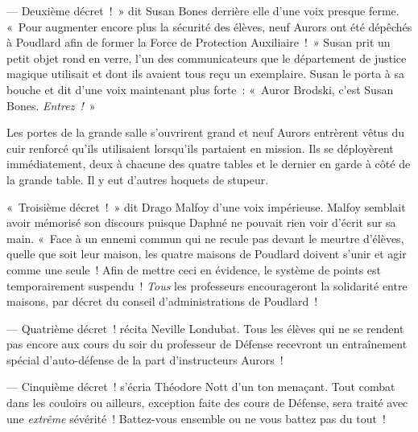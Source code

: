 --- Deuxième décret~!~»
dit Susan Bones derrière elle d'une voix presque ferme.
«~Pour augmenter encore plus la sécurité des élèves, neuf Aurors ont été dépêchés à Poudlard afin de former la Force de Protection Auxiliaire~!~»
Susan prit un petit objet rond en verre, l'un des communicateurs que le département de justice magique utilisait et dont ils avaient tous reçu un exemplaire.
Susan le porta à sa bouche et dit d'une voix maintenant plus forte~: «~Auror Brodski, c'est Susan Bones.
\emph{Entrez~!}~»

Les portes de la grande salle s'ouvrirent grand et neuf Aurors entrèrent vêtus du cuir renforcé qu'ils utilisaient lorsqu'ils partaient en mission.
Ils se déployèrent immédiatement, deux à chacune des quatre tables et le dernier en garde à côté de la grande table.
Il y eut d'autres hoquets de stupeur.

«~Troisième décret~!~»
dit Drago Malfoy d'une voix impérieuse.
Malfoy semblait avoir mémorisé son discours puisque Daphné ne pouvait rien voir d'écrit sur sa main.
«~Face à un ennemi commun qui ne recule pas devant le meurtre d'élèves, quelle que soit leur maison, les quatre maisons de Poudlard doivent s'unir et agir comme une seule~!
Afin de mettre ceci en évidence, le système de points est temporairement suspendu~!
\emph{Tous} les professeurs encourageront la solidarité entre maisons, par décret du conseil d'administrations de Poudlard~!

--- Quatrième décret~! récita Neville Londubat.
Tous les élèves qui ne se rendent pas encore aux cours du soir du professeur de Défense recevront un entraînement spécial d'auto-défense de la part d'instructeurs Aurors~!

--- Cinquième décret~! s'écria Théodore Nott d'un ton menaçant.
Tout combat dans les couloirs ou ailleurs, exception faite des cours de Défense, sera traité avec une \emph{extrême} sévérité~!
Battez-vous ensemble ou ne vous battez pas du tout~!

